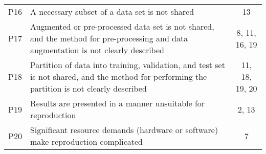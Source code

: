\begin{tabularx}{\textwidth}{cXc}
 P16 &  A necessary subset of a data set is not shared &  13 \\
 P17 &  Augmented or pre-processed data set is not shared, and the method for pre-processing and data augmentation is not clearly described &  8, 11, 16, 19 \\
 P18 &  Partition of data into training, validation, and test set is not shared, and the method for performing the partition is not clearly described &  11, 18, 19, 20 \\
 P19 &  Results are presented in a manner unsuitable for reproduction &  2, 13 \\
 P20 &  Significant resource demands (hardware or software) make reproduction complicated &  7 \\
\bottomrule
\end{tabularx}
